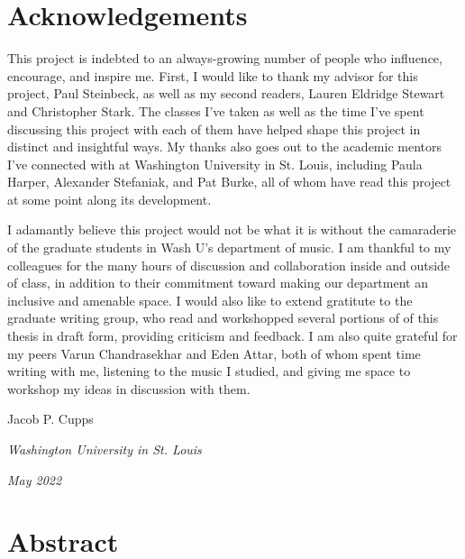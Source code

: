 \documentclass[12pt]{report}
\begin{document}
\thispagestyle{empty}

\frenchspacing

\setcounter{page}{2}
    \tableofcontents
    \listoffigures
    \listoftables

    \chapter*{Acknowledgements}

 This project is indebted to an always-growing number of people who influence, encourage, and inspire me. First, I would like to thank my advisor for this project, Paul Steinbeck, as well as my second readers, Lauren Eldridge Stewart and Christopher Stark. The classes I've taken as well as the time I've spent discussing this project with each of them have helped shape this project in distinct and insightful ways. My thanks also goes out to the academic mentors I've connected with at Washington University in St. Louis, including Paula Harper, Alexander Stefaniak, and Pat Burke, all of whom have read this project at some point along its development.
 
I adamantly believe this project would not be what it is without the camaraderie of the graduate students in Wash U's department of music. I am thankful to my colleagues for the many hours of discussion and collaboration inside and outside of class, in addition to their commitment toward making our department an inclusive and amenable space. I would also like to extend gratitute to the graduate writing group, who read and workshopped several portions of of this thesis in draft form, providing criticism and feedback. I am also quite grateful for my peers Varun Chandrasekhar and Eden Attar, both of whom spent time writing with me, listening to the music I studied, and giving me space to workshop my ideas in discussion with them.

\vspace{0.2cm}
\hfill{Jacob P. Cupps}

\noindent \textit{Washington University in St. Louis}

\noindent \textit{May 2022}

    \chapter*{Abstract}
    
\end{document}
